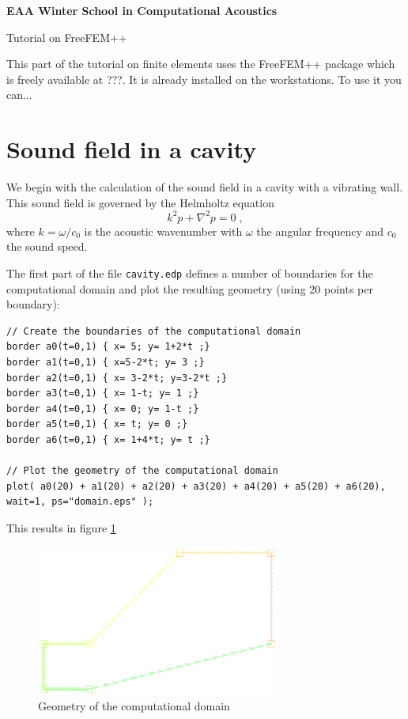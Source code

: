 \documentclass[english,3p]{elsarticle}
\newcommand{\code}[1]{\texttt{#1}}
\begin{document}
\begin{center}
\textbf{EAA Winter School in Computational Acoustics}

Tutorial on FreeFEM++
\end{center}

\vspace{10mm}

This part of the tutorial on finite elements uses the FreeFEM++ package which is freely available at ???.
It is already installed on the workstations.
To use it you can...

\section{Sound field in a cavity}

We begin with the calculation of the sound field in a cavity with a vibrating wall.
This sound field is governed by the Helmholtz equation
\begin{equation}
k^2p + \nabla^2 p = 0
\;,
\label{eq:helmholtz}
\end{equation}
where $k=\omega/c_0$ is the acoustic wavenumber with $\omega$ the angular frequency and $c_0$ the sound speed.

The first part of the file \code{cavity.edp} defines a number of boundaries for the computational domain and plot the resulting geometry (using 20 points per boundary):
\begin{lstlisting}
// Create the boundaries of the computational domain
border a0(t=0,1) { x= 5; y= 1+2*t ;}
border a1(t=0,1) { x=5-2*t; y= 3 ;} 
border a2(t=0,1) { x= 3-2*t; y=3-2*t ;}
border a3(t=0,1) { x= 1-t; y= 1 ;} 
border a4(t=0,1) { x= 0; y= 1-t ;} 
border a5(t=0,1) { x= t; y= 0 ;} 
border a6(t=0,1) { x= 1+4*t; y= t ;}

// Plot the geometry of the computational domain
plot( a0(20) + a1(20) + a2(20) + a3(20) + a4(20) + a5(20) + a6(20), wait=1, ps="domain.eps" );
\end{lstlisting}
This results in figure \ref{fig:geometry}
\begin{figure}[h]
\centering
\includegraphics[width=80mm]{domain.eps}
\caption{Geometry of the computational domain}
\label{fig:geometry}
\end{figure}
\end{document}
